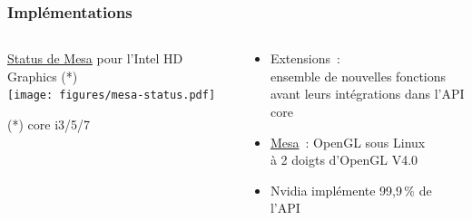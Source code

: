 \begin{frame}
  \frametitle{Implémentations}
  \begin{columns}
    \begin{column}{.5\textwidth}
      \begin{center}
        \href{http://mesamatrix.net}{Status de Mesa} pour l'Intel HD Graphics {\tiny (*)} \\[.5em]
        \texttt{[image: figures/mesa-status.pdf]} \\ %
      \end{center}
      {\tiny (*) core i3/5/7}
    \end{column}
    \begin{column}{.5\textwidth}
      \begin{itemize}
      \item {\small Extensions~: \\
        ensemble de nouvelles fonctions \\
        avant leurs intégrations dans l'API core}
      \item \href{http://www.mesa3d.org}{Mesa}~: OpenGL sous Linux \\
        à 2 doigts d'OpenGL V4.0
      \item Nvidia implémente 99,9\,\% de l'API %
      \end{itemize}
    \end{column}
  \end{columns}
\end{frame}

